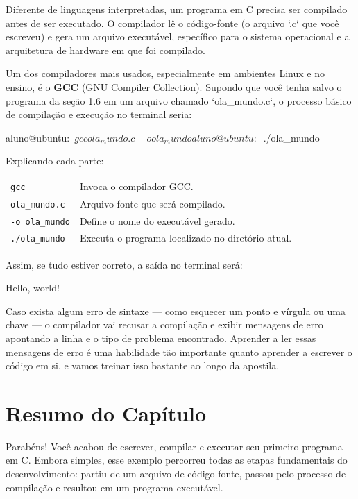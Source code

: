 \documentclass[12pt,a4paper,oneside]{extreport}
\begin{document}
Diferente de linguagens interpretadas, um programa em C precisa ser compilado antes de ser executado. O compilador lê o código-fonte (o arquivo `.c` que você escreveu) e gera um arquivo executável, específico para o sistema operacional e a arquitetura de hardware em que foi compilado.

Um dos compiladores mais usados, especialmente em ambientes Linux e no ensino, é o \textbf{GCC} (GNU Compiler Collection). Supondo que você tenha salvo o programa da seção 1.6 em um arquivo chamado `ola\_mundo.c`, o processo básico de compilação e execução no terminal seria:


\begin{terminal}
aluno@ubuntu:~$ gcc ola_mundo.c -o ola_mundo

aluno@ubuntu:~$ ./ola_mundo

\end{terminal}


Explicando cada parte:

\begin{tabular}{p{4.4cm}p{10cm}}
\texttt{gcc} & Invoca o compilador GCC.\\[0.2cm]

\texttt{ola\_mundo.c} &
Arquivo-fonte que será compilado.\\[0.2cm]

\texttt{-o ola\_mundo} &
Define o nome do executável gerado.\\[0.2cm]

\texttt{./ola\_mundo} &
Executa o programa localizado no diretório atual.
\end{tabular}


Assim, se tudo estiver correto, a saída no terminal será:

\begin{terminal}
Hello, world!
\end{terminal}

Caso exista algum erro de sintaxe — como esquecer um ponto e vírgula ou uma chave — o compilador vai recusar a compilação e exibir mensagens de erro apontando a linha e o tipo de problema encontrado. Aprender a ler essas mensagens de erro é uma habilidade tão importante quanto aprender a escrever o código em si, e vamos treinar isso bastante ao longo da apostila.


\section*{Resumo do Capítulo}

Parabéns! Você acabou de escrever, compilar e executar seu primeiro programa em C. Embora simples, esse exemplo percorreu todas as etapas fundamentais do desenvolvimento: partiu de um arquivo de código-fonte, passou pelo processo de compilação e resultou em um programa executável.
\end{document}
